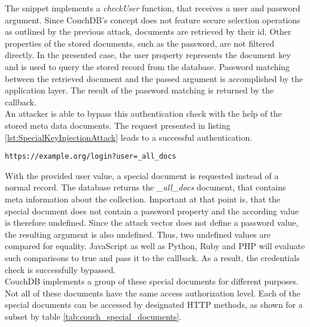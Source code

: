 The snippet implements a \emph{checkUser} function, that receives a user and password argument. Since CouchDB's concept does not feature secure selection operations as outlined by the previous attack, documents are retrieved by their id. Other properties of the stored documents, such as the password, are not filtered directly. In the presented case, the user property represents the document key and is used to query the stored record from the database. Password matching between the retrieved document and the passed argument is accomplished by the application layer. The result of the password matching is returned by the callback. \\

An attacker is able to bypass this authentication check with the help of the stored meta data documents. The request presented in listing \ref{lst:SpecialKeyInjectionAttack} leads to a successful authentication.
 
\begin{lstlisting}[caption={Attack vector against CouchDB for speical key injection via the query-string parameter}, label={lst:SpecialKeyInjectionAttack}]
https://example.org/login?user=_all_docs
\end{lstlisting}

With the provided user value, a special document is requested instead of a normal record. The database returns the \emph{\_all\_docs} document, that contains meta information about the collection. Important at that point is, that the special document does not contain a password property and the according value is therefore undefined. Since the attack vector does not define a password value, the resulting argument is also undefined. Thus, two undefined values are compared for equality. JavaScript as well as Python, Ruby and PHP will evaluate such comparisons to true and pass it to the callback. As a result, the credentials check is successfully bypassed.\\

CouchDB implements a group of these special documents for different purposes. Not all of these documents have the same access authorization level. Each of the special documents can be accessed by designated HTTP methods, as shown for a subset by table \ref{tab:couch_special_documents}. \\

